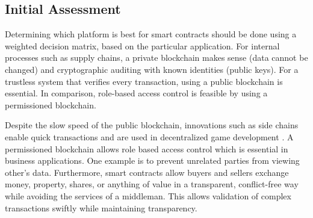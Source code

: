 \newpage 
\subsection{Initial Assessment}



Determining which platform is best for smart contracts should be done using a weighted decision matrix, based on the particular application. For internal processes such as supply chains, a private blockchain makes sense (data cannot be changed) and cryptographic auditing with known identities (public keys). For a trustless system that verifies every transaction, using a public blockchain is essential. In comparison, role-based access control is feasible by using a permissioned blockchain. \hfill \break

Despite the slow speed of the public blockchain, innovations such as side chains enable quick transactions and are used in decentralized game development \cite{loomNetwork:Online}. A permissioned blockchain allows role based access control which is essential in business applications. One example is to prevent unrelated parties from viewing other's data. 	Furthermore, smart contracts allow buyers and sellers exchange money, property, shares, or anything of value in a transparent, conflict-free way while avoiding the services of a middleman. This allows validation of complex transactions swiftly while maintaining transparency.


